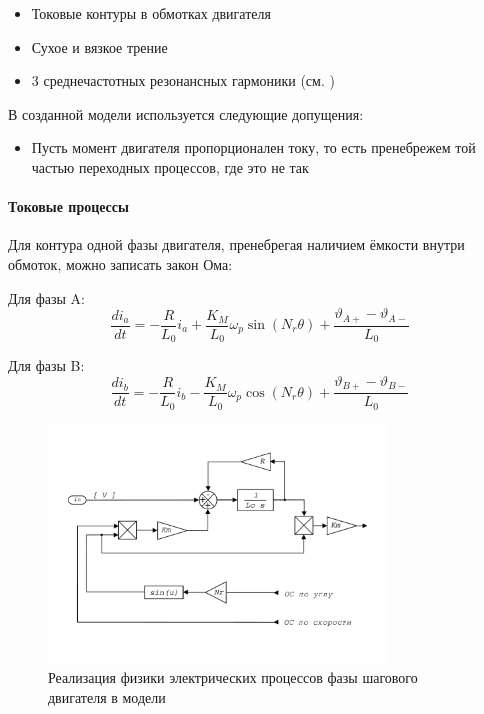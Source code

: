 \begin{itemize}
    \item Токовые контуры в обмотках двигателя
    \item Сухое и вязкое трение
    \item 3 среднечастотных резонансных гармоники (см. \cite{Novel_Modeling_and_Damping})
\end{itemize}

В созданной модели используется следующие допущения:

\begin{itemize}
    \item Пусть момент двигателя пропорционален току, то есть пренебрежем той частью переходных
            процессов, где это не так
\end{itemize}

\paragraph{Токовые процессы}
Для контура одной фазы двигателя, пренебрегая наличием ёмкости внутри обмоток, можно записать
закон Ома:

Для фазы A:
\begin{equation}
    \frac{di_{a}}{dt} =
        - \frac{R}{L_{0}} i_{a}
        + \frac{K_{M}}{L_{0}} \omega_{p} \sin(N_{r}\theta)
        + \frac{\vartheta_{A+} - \vartheta_{A-}}{L_{0}}
\end{equation}

Для фазы B:
\begin{equation}
    \frac{di_{b}}{dt} =
        - \frac{R}{L_{0}} i_{b}
        - \frac{K_{M}}{L_{0}} \omega_{p} \cos(N_{r}\theta)
        + \frac{\vartheta_{B+} - \vartheta_{B-}}{L_{0}}
\end{equation}

\begin{figure}[ht!]
    \centering
    \includegraphics[width=0.8\textwidth, keepaspectratio]
                    {./src/pictures/drive_model/drive_model_current_equation}
    \caption{Реализация физики электрических процессов фазы шагового двигателя в модели}
    \label{pic_drive_model_current_equation}
\end{figure}

